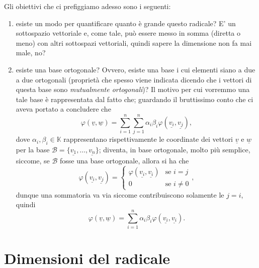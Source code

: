 Gli obiettivi che ci prefiggiamo adesso sono i seguenti:
\begin{enumerate}
	\item esiste un modo per quantificare quanto è grande questo radicale? E' un sottospazio vettoriale e, come tale, può essere messo in somma (diretta o meno) con altri sottospazi vettoriali, quindi sapere la dimensione non fa mai male, no?
	\item esiste una base ortogonale? Ovvero, esiste una base i cui elementi siano a due a due ortogonali (proprietà che spesso viene indicata dicendo che i vettori di questa base sono \emph{mutualmente ortogonali})? Il motivo
	per cui vorremmo una tale base è rappresentata dal fatto che; guardando il bruttissimo conto che ci aveva portato a concludere che
	$$
		\varphi(\underline{v}, \underline{w}) = \sum_{i=1}^n \sum_{j=1}^n \alpha_i \beta_i \varphi(\underline{v_i}, \underline{v_j}),
	$$
	dove $\alpha_i, \beta_i \in \mathbb{K}$ rappresentano rispettivamente le coordinate dei vettori $\underline{v}$ e $\underline{w}$ per la base $\mathcal{B} = \{ \underline{v_1}, \ldots, \underline{v_n} \}$; diventa, in base ortogonale, molto più semplice, siccome, se $\mathcal{B}$ fosse una base ortogonale, allora si ha che
	$$
		\varphi(\underline{v_i}, \underline{v_j}) = \begin{cases}
			\varphi(\underline{v_i}, \underline{v_i}) & \text{se } i = j \\
			0 & \text{se } i \neq 0
		\end{cases},
	$$
	dunque una sommatoria va via siccome contribuiscono solamente le $j = i$, quindi
	$$
		\varphi(\underline{v}, \underline{w}) = \sum_{i=1}^n \alpha_i \beta_i \varphi(\underline{v_i}, \underline{v_i}).
	$$
\end{enumerate}
\section{Dimensioni del radicale}

